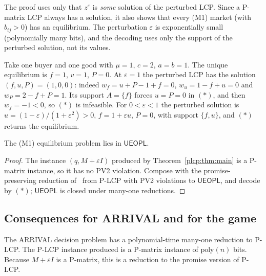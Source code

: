 The proof uses only that $z^\varepsilon$ is \emph{some} solution of the perturbed LCP. Since a P-matrix
LCP always has a solution, it also shows that every (M1) market (with $b_{ij}>0$) has an equilibrium. The
perturbation $\varepsilon$ is exponentially small (polynomially many bits), and the decoding uses only
the support of the perturbed solution, not its values.

\begin{example}\label{plcp:ex:negative}
Take one buyer and one good with $\mu=1$, $c=2$, $a=b=1$. The unique equilibrium is $f=1$, $v=1$,
$P=0$. At $\varepsilon=1$ the perturbed LCP has the solution $(f,u,P)=(1,0,0)$: indeed
$w_f=u+P-1+f=0$, $w_u=1-f+u=0$ and $w_P=2-f+P=1$. Its support $A=\{f\}$ forces $u=P=0$ in $(\ast)$, and
then $w_f=-1<0$, so $(\ast)$ is infeasible. For $0<\varepsilon<1$ the perturbed solution is
$u=(1-\varepsilon)/(1+\varepsilon^2)>0$, $f=1+\varepsilon u$, $P=0$, with support $\{f,u\}$, and $(\ast)$
returns the equilibrium.
\end{example}

\begin{corollary}[(M1) is in UEOPL]\label{plcp:cor:ueopl}
\statusrefereed
The (M1) equilibrium problem lies in $\mathsf{UEOPL}$.
\end{corollary}

\begin{proof}
The instance $(q,M+\varepsilon I)$ produced by Theorem~\ref{plcp:thm:main} is a P-matrix instance, so it
has no PV2 violation. Compose with the promise-preserving reduction of~\cite[Thm.~81]{fgms18} from P-LCP
with PV2 violations to $\mathsf{UEOPL}$, and decode by $(\ast)$; $\mathsf{UEOPL}$ is closed under
many-one reductions.
\end{proof}

\subsection{Consequences for ARRIVAL and for the game}

\begin{corollary}\label{plcp:cor:arrival}
\statusrefereed
The ARRIVAL decision problem has a polynomial-time many-one reduction to P-LCP. The P-LCP instance
produced is a P-matrix instance of $\mathrm{poly}(n)$ bits. Because $M+\varepsilon I$ is a P-matrix, this is a reduction to the
promise version of P-LCP.
\end{corollary}

